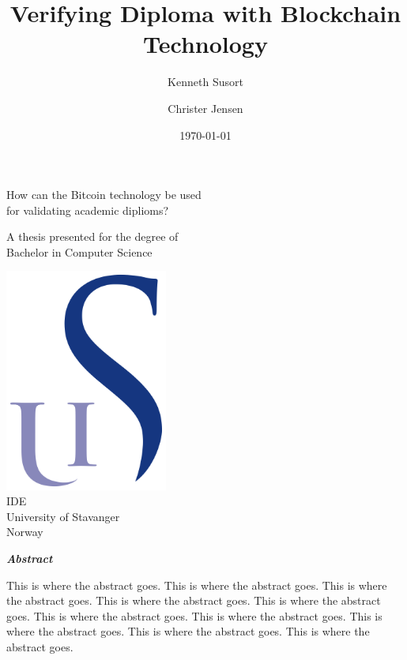 \documentclass[11pt]{article}
\title{Verifying Diploma with Blockchain Technology}
\author{Kenneth Susort \and Christer Jensen}
\date{\today}
\begin{document}
\begin{titlepage}
    \begin{center}
        
        \huge
        \textbf{\thetitle}
        
        \vspace{0.5cm}
        \large
       	How can the Bitcoin technology be used\\ for validating academic diplioms?
        
        \vspace{0.5cm}
        
        \textbf{\theauthor}
        
        \vfill
        
        A thesis presented for the degree of\\
        Bachelor in Computer Science
        
        \vspace{0.8cm}
        
        \includegraphics[width=0.4\textwidth]{university_logo.png}\\
        \large
        IDE\\
        University of Stavanger\\
        Norway\\
        \thedate
        
    \end{center}
\end{titlepage}

\begin{center}
	\vspace*{4cm}
	\textbf{\textit{Abstract}}
\end{center}


This is where the abstract goes. This is where the abstract goes. This is where the abstract goes. This is where the abstract goes. This is where the abstract goes. This is where the abstract goes. This is where the abstract goes. This is where the abstract goes. This is where the abstract goes. This is where the abstract goes.
\newpage
\end{document}
